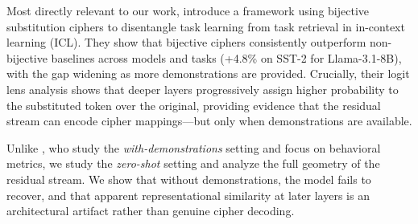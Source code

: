 Most directly relevant to our work, \citet{fang2025iclciphers} introduce a framework using bijective substitution ciphers to disentangle task learning from task retrieval in in-context learning (ICL). They show that bijective ciphers consistently outperform non-bijective baselines across models and tasks (\eg +4.8\% on SST-2 for Llama-3.1-8B), with the gap widening as more demonstrations are provided. Crucially, their logit lens analysis shows that deeper layers progressively assign higher probability to the substituted token over the original, providing evidence that the residual stream can encode cipher mappings---but only when demonstrations are available.

Unlike \citet{fang2025iclciphers}, who study the \emph{with-demonstrations} setting and focus on behavioral metrics, we study the \emph{zero-shot} setting and analyze the full geometry of the residual stream. We show that without demonstrations, the model fails to recover, and that apparent representational similarity at later layers is an architectural artifact rather than genuine cipher decoding.
